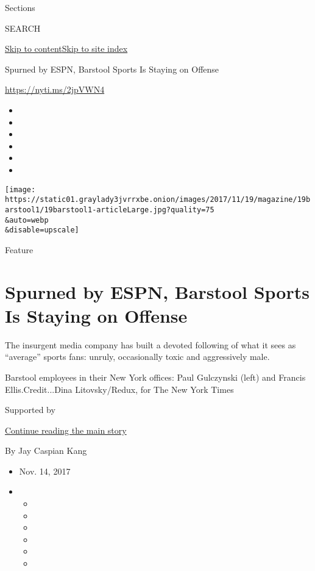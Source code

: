 Sections

SEARCH

\protect\hyperlink{site-content}{Skip to
content}\protect\hyperlink{site-index}{Skip to site index}

Spurned by ESPN, Barstool Sports Is Staying on Offense

\url{https://nyti.ms/2jpVWN4}

\begin{itemize}
\item
\item
\item
\item
\item
\item
\end{itemize}

\texttt{[image: https://static01.graylady3jvrrxbe.onion/images/2017/11/19/magazine/19barstool1/19barstool1-articleLarge.jpg?quality=75\\\&auto=webp\\\&disable=upscale]}

Feature

\hypertarget{spurned-by-espn-barstool-sports-is-staying-on-offense}{%
\section{Spurned by ESPN, Barstool Sports Is Staying on
Offense}\label{spurned-by-espn-barstool-sports-is-staying-on-offense}}

The insurgent media company has built a devoted following of what it
sees as ``average'' sports fans: unruly, occasionally toxic and
aggressively male.

Barstool employees in their New York offices: Paul Gulczynski (left) and
Francis Ellis.Credit...Dina Litovsky/Redux, for The New York Times

Supported by

\protect\hyperlink{after-sponsor}{Continue reading the main story}

By Jay Caspian Kang

\begin{itemize}
\item
  Nov. 14, 2017
\item
  \begin{itemize}
  \item
  \item
  \item
  \item
  \item
  \item
  \end{itemize}
\end{itemize}

